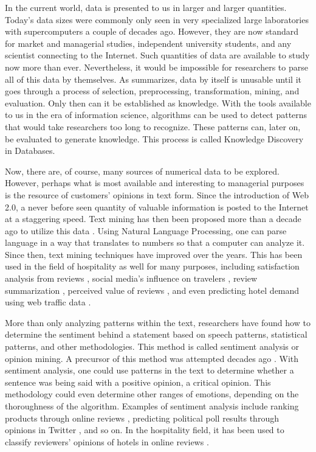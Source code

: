 \documentclass[smallextended,natbib]{svjour3}       %
\begin{document}
    In the current world, data is presented to us in larger and larger quantities. Today's data sizes were commonly only seen in very specialized large laboratories with supercomputers a couple of decades ago. However, they are now standard for market and managerial studies, independent university students, and any scientist connecting to the Internet. Such quantities of data are available to study now more than ever. Nevertheless, it would be impossible for researchers to parse all of this data by themselves. As \cite{fayyad1996data} summarizes, data by itself is unusable until it goes through a process of selection, preprocessing, transformation, mining, and evaluation. Only then can it be established as knowledge. With the tools available to us in the era of information science, algorithms can be used to detect patterns that would take researchers too long to recognize. These patterns can, later on, be evaluated to generate knowledge. This process is called Knowledge Discovery in Databases. 

    Now, there are, of course, many sources of numerical data to be explored.  However, perhaps what is most available and interesting to managerial purposes is the resource of customers' opinions in text form. Since the introduction of Web 2.0, a never before seen quantity of valuable information is posted to the Internet at a staggering speed. Text mining has then been proposed more than a decade ago to utilize this data \cite[e.g.][]{rajman1998text,nahm2002text}. Using Natural Language Processing, one can parse language in a way that translates to numbers so that a computer can analyze it. Since then, text mining techniques have improved over the years. This has been used in the field of hospitality as well for many purposes, including satisfaction analysis from reviews \cite[e.g][]{berezina2016, xu2016, xiang2015, hargreaves2015, balbi2018}, social media's influence on travelers \cite[e.g.][]{xiang2010}, review summarization \cite[e.g.][]{hu2017436}, perceived value of reviews \cite[e.g][]{FANG2016498}, and even predicting hotel demand using web traffic data \cite[e.g][]{yang2014}.

    More than only analyzing patterns within the text, researchers have found how to determine the sentiment behind a statement based on speech patterns, statistical patterns, and other methodologies. This method is called sentiment analysis or opinion mining. A precursor of this method was attempted decades ago \cite[][]{stone1966general}. With sentiment analysis, one could use patterns in the text to determine whether a sentence was being said with a positive opinion, a critical opinion. This methodology could even determine other ranges of emotions, depending on the thoroughness of the algorithm. Examples of sentiment analysis include ranking products through online reviews \cite[e.g][]{liu2017149, zhang2011}, predicting political poll results through opinions in Twitter \cite[][]{oconnor2010}, and so on. In the hospitality field, it has been used to classify reviewers' opinions of hotels in online reviews \cite[e.g.][]{kim2017362, alsmadi2018}. 
\end{document}
